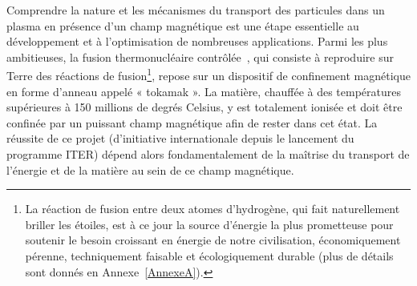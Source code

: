 \renewcommand{\thefigure}{\arabic{figure}}
\renewcommand{\theequation}{\arabic{equation}}
\begin{refsection}
Comprendre la nature et les mécanismes du transport des particules dans un
plasma en présence d'un champ magnétique est une étape essentielle au
développement et à l'optimisation de nombreuses applications.
Parmi les plus ambitieuses, la fusion thermonucléaire
contrôlée~\parencite{Wesson}, qui consiste à reproduire sur Terre des réactions
de fusion\footnote{La réaction de fusion entre deux atomes d'hydrogène, qui fait naturellement briller les
étoiles, est à ce jour la source d'énergie la plus prometteuse pour soutenir le besoin croissant en énergie de notre civilisation,
économiquement pérenne, techniquement faisable et écologiquement durable
(plus de détails sont donnés en Annexe~\ref{AnnexeA}).}, repose sur un
dispositif de confinement magnétique en forme d'anneau appelé « tokamak ».
La matière, chauffée à des températures supérieures à 150 millions de degrés
Celsius, y est totalement ionisée et doit être confinée par un puissant champ magnétique afin
de rester dans cet état. La réussite de ce projet (d'initiative
internationale depuis le lancement du programme ITER) dépend alors
fondamentalement de la maîtrise du transport de l'énergie et de la matière au
sein de ce champ magnétique.


\end{refsection}
